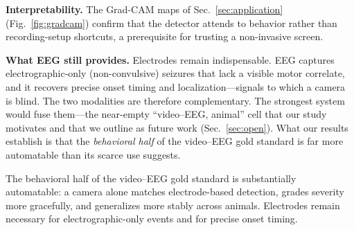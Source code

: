 \noindent\textbf{Interpretability.}
The Grad-CAM maps of Sec.~\ref{sec:application} (Fig.~\ref{fig:gradcam})
confirm that the detector
attends to behavior rather than recording-setup shortcuts, a prerequisite for
trusting a non-invasive screen.

\noindent\textbf{What EEG still provides.}
Electrodes remain indispensable. EEG captures electrographic-only
(non-convulsive) seizures that lack a visible motor correlate, and it recovers
precise onset timing and localization---signals to which a camera is blind. The
two modalities are therefore complementary. The strongest system would fuse
them---the near-empty ``video--EEG, animal'' cell that our study motivates and
that we outline as future work (Sec.~\ref{sec:open}). What our results establish
is that the \emph{behavioral half} of the video--EEG gold standard is far more
automatable than its scarce use suggests.

\begin{takeaway}
\takeawaylabel The behavioral half of the video--EEG gold standard is substantially automatable:
a camera alone matches electrode-based detection, grades severity more gracefully,
and generalizes more stably across animals. Electrodes remain necessary for
electrographic-only events and for precise onset timing.
\end{takeaway}

